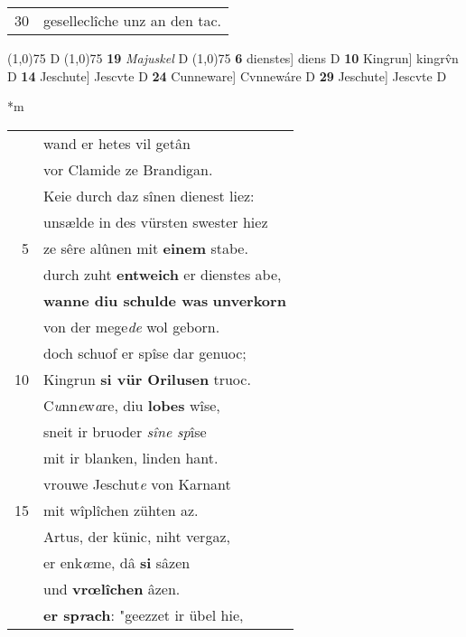 \documentclass[8pt,a4paper,notitlepage]{article}
\begin{document}
\begin{table}[ht]
\begin{minipage}[t]{0.5\linewidth}
\begin{tabular}{rl}
30 & geselleclîche unz an den tac.\\ 
\end{tabular}
\scriptsize
\line(1,0){75} \newline
D \newline
\line(1,0){75} \newline
\textbf{19} \textit{Majuskel} D  \newline
\line(1,0){75} \newline
\textbf{6} dienstes] diens D \textbf{10} Kingrun] kingrv̂n D \textbf{14} Jeschute] Jescvte D \textbf{24} Cunneware] Cvnnewáre D \textbf{29} Jeschute] Jescvte D \newline
\end{minipage}
\hspace{0.5cm}
\begin{minipage}[t]{0.5\linewidth}
\small
\begin{center}*m
\end{center}
\begin{tabular}{rl}
 & wand er hetes vil getân\\ 
 & vor Clamide ze Brandigan.\\ 
 & Keie durch daz sînen dienest liez:\\ 
 & unsælde in des vürsten swester hiez\\ 
5 & ze sêre alûnen mit \textbf{einem} stabe.\\ 
 & durch zuht \textbf{entweich} er dienstes abe,\\ 
 & \textbf{wanne diu schulde was} \textbf{unverkorn}\\ 
 & von der mege\textit{de} wol geborn.\\ 
 & doch schuof er spîse dar genuoc;\\ 
10 & Kingrun \textbf{si vür Orilusen} truoc.\\ 
 & C\textit{u}nn\textit{e}w\textit{a}re, diu \textbf{lobes} wîse,\\ 
 & sneit ir bruoder \textit{sîne sp}îse\\ 
 & mit ir blanken, linden hant.\\ 
 & vrouwe Jeschut\textit{e} von Karnant\\ 
15 & mit wîplîchen zühten az.\\ 
 & Artus, der künic, niht vergaz,\\ 
 & er enk\textit{œ}me, dâ \textbf{si} sâzen\\ 
 & und \textbf{vrœlîchen} âzen.\\ 
 & \textbf{er sp\textit{r}ach}: "geezzet ir übel hie,\\ 

\end{tabular}
\end{minipage}
\end{table}
\end{document}
